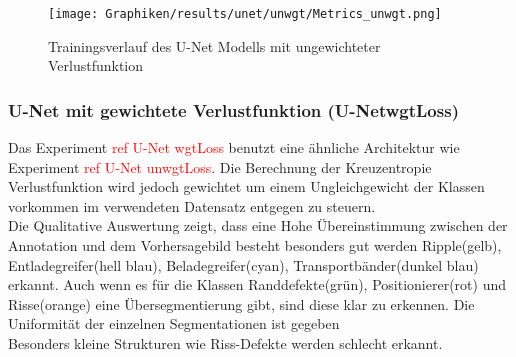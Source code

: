     \begin{figure}[h!]
         \centering
         \texttt{[image: Graphiken/results/unet/unwgt/Metrics\_unwgt.png]}
         \caption{Trainingsverlauf des U-Net Modells mit ungewichteter Verlustfunktion}
         \label{fig:unet_unwgt_metrics}
     \end{figure}
     

    
         
    \subsubsection*{U-Net mit gewichtete Verlustfunktion (U-Net\textunderscore wgtLoss)}
    Das Experiment \textcolor{red}{ref U-Net \textunderscore wgtLoss} benutzt eine ähnliche Architektur wie Experiment \textcolor{red}{ref U-Net \textunderscore unwgtLoss}. Die Berechnung der Kreuzentropie Verlustfunktion wird jedoch gewichtet um einem Ungleichgewicht der Klassen vorkommen im verwendeten Datensatz entgegen zu steuern. \\
    Die Qualitative Auswertung zeigt, dass eine Hohe Übereinstimmung zwischen der Annotation und dem Vorhersagebild besteht besonders gut werden Ripple(gelb), Entladegreifer(hell blau), Beladegreifer(cyan), Transportbänder(dunkel blau) erkannt. Auch wenn es für die Klassen Randdefekte(grün), Positionierer(rot) und Risse(orange) eine Übersegmentierung gibt, sind diese klar zu erkennen. Die Uniformität der einzelnen Segmentationen ist gegeben\\
    Besonders kleine Strukturen wie Riss-Defekte werden schlecht erkannt. 
    
